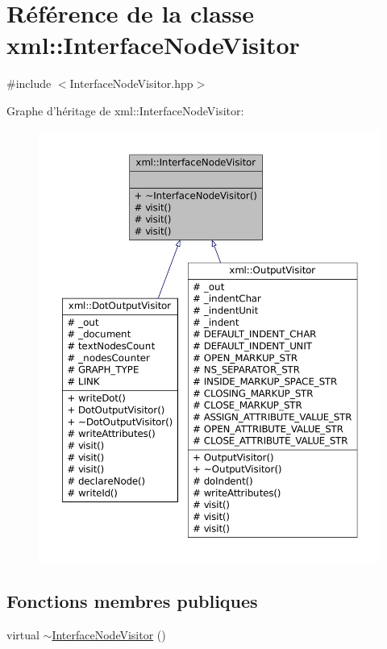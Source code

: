 \hypertarget{classxml_1_1_interface_node_visitor}{
\section{Référence de la classe xml::InterfaceNodeVisitor}
\label{classxml_1_1_interface_node_visitor}
}


{\ttfamily \#include $<$InterfaceNodeVisitor.hpp$>$}



Graphe d'héritage de xml::InterfaceNodeVisitor:
\nopagebreak
\begin{figure}[H]
\begin{center}
\leavevmode
\includegraphics[width=400pt]{classxml_1_1_interface_node_visitor__inherit__graph}
\end{center}
\end{figure}
\subsection*{Fonctions membres publiques}
\begin{DoxyCompactItemize}
\item 
virtual \hyperlink{classxml_1_1_interface_node_visitor_a53c5fa9a736af1450bbc3d95feffe94a}{$\sim$InterfaceNodeVisitor} ()
\end{DoxyCompactItemize}
